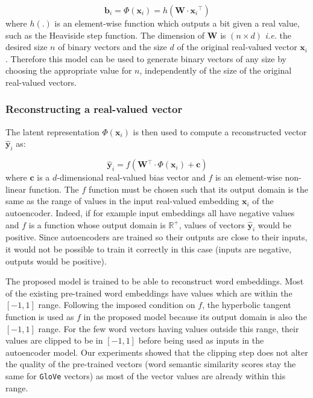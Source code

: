       \begin{equation}
        \mathbf{b}_i = \Phi(\mathbf{x}_i)
                     = h(\mathbf{W} \cdot \mathbf{x}_i{}^\top)
      \end{equation}
      where $h(.)$ is an element-wise function which outputs a bit given a real
      value, such as the Heaviside step function. The dimension of $\mathbf{W}$
      is $(n \times d)$ \textit{i.e.} the desired size $n$ of binary vectors and
      the size $d$ of the original real-valued vector $\mathbf{x}_i$. Therefore
      this model can be used to generate binary vectors of any size by choosing
      the appropriate value for $n$, independently of the size of the original
      real-valued vectors.

    \subsubsection{Reconstructing a real-valued vector}
      The latent representation $\Phi(\mathbf{x}_i)$ is then used to compute a
      reconstructed vector $\hat{\mathbf{y}}_i$ as:

      \begin{equation}
        \hat{\mathbf{y}}_i = f(\mathbf{W}{}^\top \cdot \Phi(\mathbf{x}_i)
                             + \mathbf{c})
      \end{equation}
      where $\mathbf{c}$ is a $d$-dimensional real-valued bias vector and $f$ is
      an element-wise non-linear function. The $f$ function must be chosen such
      that its output domain is the same as the range of values in the input
      real-valued embedding $\mathbf{x}_i$ of the autoencoder. Indeed, if for
      example input embeddings all have negative values and $f$ is a function
      whose output domain is $\mathbb{R}^{+}$, values of vectors
      $\hat{\mathbf{y}}_i$ would be positive. Since autoencoders are trained so
      their outputs are close to their inputs, it would not be possible to train
      it correctly in this case (inputs are negative, outputs would be
      positive).\medskip

      The proposed model is trained to be able to reconstruct word embeddings.
      Most of the existing pre-trained word embeddings have values which are
      within the $[-1, 1]$ range. Following the imposed condition on $f$, the
      hyperbolic tangent function is used as $f$ in the proposed model because
      its output domain is also the $[-1, 1]$ range. For the few word vectors
      having values outside this range, their values are clipped to be in $[-1,
      1]$ before being used as inputs in the autoencoder model. Our experiments
      showed that the clipping step does not alter the quality of the
      pre-trained vectors (word semantic similarity scores stay the same for
      \texttt{GloVe} vectors) as most of the vector values are already within
      this range.


